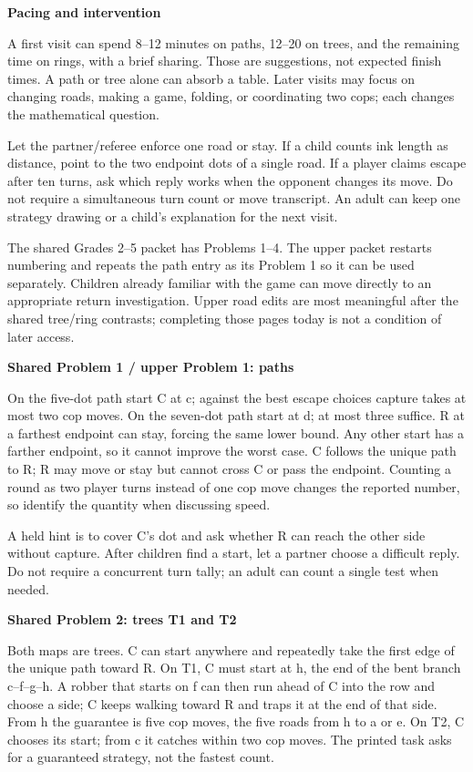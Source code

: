 \documentclass[11pt,letterpaper]{article}
\newcommand{\heading}[1]{\par\vspace{4pt}{\large\bfseries #1}\par}
\newcommand{\sub}[1]{\par\textbf{#1}\par}
\begin{document}
\sub{Pacing and intervention}
A first visit can spend 8--12 minutes on paths, 12--20 on trees, and the remaining time on rings, with a brief sharing. Those are suggestions, not expected finish times. A path or tree alone can absorb a table. Later visits may focus on changing roads, making a game, folding, or coordinating two cops; each changes the mathematical question.

Let the partner/referee enforce one road or stay. If a child counts ink length as distance, point to the two endpoint dots of a single road. If a player claims escape after ten turns, ask which reply works when the opponent changes its move. Do not require a simultaneous turn count or move transcript. An adult can keep one strategy drawing or a child's explanation for the next visit.
\newpage
\heading{Shared packet: strategy from play}
The shared Grades 2--5 packet has Problems 1--4. The upper packet restarts numbering and repeats the path entry as its Problem 1 so it can be used separately. Children already familiar with the game can move directly to an appropriate return investigation. Upper road edits are most meaningful after the shared tree/ring contrasts; completing those pages today is not a condition of later access.

\sub{Shared Problem 1 / upper Problem 1: paths}
On the five-dot path start C at c; against the best escape choices capture takes at most two cop moves. On the seven-dot path start at d; at most three suffice. R at a farthest endpoint can stay, forcing the same lower bound. Any other start has a farther endpoint, so it cannot improve the worst case. C follows the unique path to R; R may move or stay but cannot cross C or pass the endpoint. Counting a round as two player turns instead of one cop move changes the reported number, so identify the quantity when discussing speed.

A held hint is to cover C's dot and ask whether R can reach the other side without capture. After children find a start, let a partner choose a difficult reply. Do not require a concurrent turn tally; an adult can count a single test when needed.

\sub{Shared Problem 2: trees T1 and T2}
Both maps are trees. C can start anywhere and repeatedly take the first edge of the unique path toward R. On T1, C must start at h, the end of the bent branch c--f--g--h. A robber that starts on f can then run ahead of C into the row and choose a side; C keeps walking toward R and traps it at the end of that side. From h the guarantee is five cop moves, the five roads from h to a or e. On T2, C chooses its start; from c it catches within two cop moves. The printed task asks for a guaranteed strategy, not the fastest count.
\end{document}
